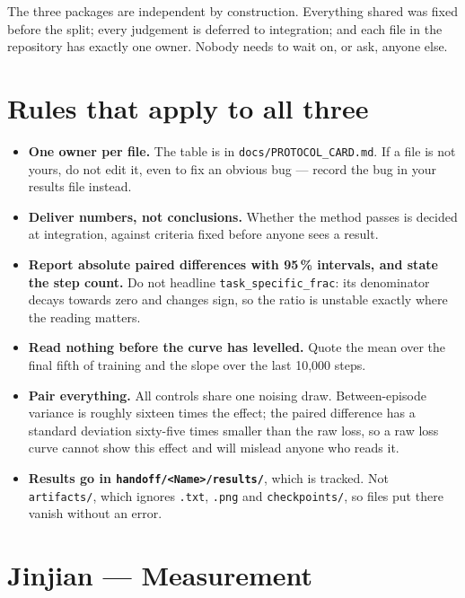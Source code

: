 \documentclass[11pt]{article}
\newcommand{\code}[1]{\texttt{\small #1}}
\begin{document}
\vspace{0.6em}
\noindent
The three packages are independent by construction. Everything shared was fixed before
the split; every judgement is deferred to integration; and each file in the repository
has exactly one owner. Nobody needs to wait on, or ask, anyone else.

\section{Rules that apply to all three}

\begin{itemize}
  \item \textbf{One owner per file.} The table is in \code{docs/PROTOCOL\_CARD.md}. If a
    file is not yours, do not edit it, even to fix an obvious bug --- record the bug in
    your results file instead.
  \item \textbf{Deliver numbers, not conclusions.} Whether the method passes is decided at
    integration, against criteria fixed before anyone sees a result.
  \item \textbf{Report absolute paired differences with 95\,\% intervals, and state the
    step count.} Do not headline \code{task\_specific\_frac}: its denominator decays
    towards zero and changes sign, so the ratio is unstable exactly where the reading
    matters.
  \item \textbf{Read nothing before the curve has levelled.} Quote the mean over the final
    fifth of training and the slope over the last 10{,}000 steps.
  \item \textbf{Pair everything.} All controls share one noising draw. Between-episode
    variance is roughly sixteen times the effect; the paired difference has a standard
    deviation sixty-five times smaller than the raw loss, so a raw loss curve cannot show
    this effect and will mislead anyone who reads it.
  \item \textbf{Results go in \code{handoff/<Name>/results/}}, which is tracked. Not
    \code{artifacts/}, which ignores \code{.txt}, \code{.png} and \code{checkpoints/}, so
    files put there vanish without an error.
\end{itemize}

\section{Jinjian --- Measurement}
\end{document}

